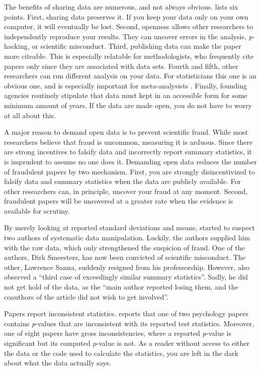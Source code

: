 The benefits of sharing data are numerous, and not always obvious. \textcite{Wicherts2012-cp} lists six points. First, sharing data preserves it. If you keep your data only on your own computer, it will eventually be lost. Second, openness allows other researchers to independently reproduce your results. They can uncover errors in the analysis, \emph{p-}hacking, or scientific misconduct. Third, publishing data can make the paper more citeable. This is especially relatable for methodologists, who frequently cite papers only since they are associated with data sets. Fourth and fifth, other researchers can run different analysis on your data. For statisticians this one is an obvious one, and is especially important for meta-analysists \parencite{Cooper2009-ge}. Finally, founding agencies routinely stipulate that data must kept in an accessible form for some minimum amount of years. If the data are made open, you do not have to worry at all about this.  

A major reason to demand open data is to prevent scientific fraud. While most researchers believe that fraud is uncommon, measuring it is arduous. Since there are strong incentives to falsify data and incorrectly report summary statistics, it is imprudent to assume no one does it. Demanding open data reduces the number of fraudulent papers by two mechanism. First, you are strongly disincentivized to falsify data and summary statistics when the data are publicly available. For other researchers can, in principle, uncover your fraud at any moment. Second, fraudulent papers will be uncovered at a greater rate when the evidence is available for scrutiny. 

By merely looking at reported standard deviations and means, \textcite{Simonsohn2013-ul} started to suspect two authors of systematic data manipulation. Luckily, the authors supplied him with the raw data, which only strengthened the suspicion of fraud. One of the authors, Dirk Smeesters, has now been convicted of scientific misconduct. The other, Lawrence Sanna, suddenly resigned from his professorship. However, \textcite{Simonsohn2013-ul}
also observed a ``third case of exceedingly similar summary statistics''. Sadly, he did not get hold of the data, as the ``main author reported losing them, and the coauthors of the article did not wish to get involved''.

Papers report inconsistent statistics. \textcite{Nuijten2016-eu} reports that one of two psychology papers contains \emph{p}-values that are inconsistent with its reported test statistics. Moreover, one of eight papers have gross inconsistencies, where a reported \emph{p}-value is significant but its computed \emph{p}-value is not. As a reader without access to either the data or the code used to calculate the statistics, you are left in the dark about what the data actually says.

